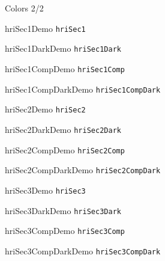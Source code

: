 \documentclass[compress]{beamer}
\begin{document}
\begin{frame}{Colors 2/2}
\begin{multicols}{2}

\begin{beamercolorbox}[wd=\linewidth,ht=2ex,dp=0.7ex]{hriSec1Demo}
	\texttt{hriSec1}
\end{beamercolorbox}
\begin{beamercolorbox}[wd=\linewidth,ht=2ex,dp=0.7ex]{hriSec1DarkDemo}
	\texttt{hriSec1Dark}
\end{beamercolorbox}
\begin{beamercolorbox}[wd=\linewidth,ht=2ex,dp=0.7ex]{hriSec1CompDemo}
	\texttt{hriSec1Comp}
\end{beamercolorbox}
\begin{beamercolorbox}[wd=\linewidth,ht=2ex,dp=0.7ex]{hriSec1CompDarkDemo}
	\texttt{hriSec1CompDark}
\end{beamercolorbox}

\begin{beamercolorbox}[wd=\linewidth,ht=2ex,dp=0.7ex]{hriSec2Demo}
	\texttt{hriSec2}
\end{beamercolorbox}
\begin{beamercolorbox}[wd=\linewidth,ht=2ex,dp=0.7ex]{hriSec2DarkDemo}
	\texttt{hriSec2Dark}
\end{beamercolorbox}
\begin{beamercolorbox}[wd=\linewidth,ht=2ex,dp=0.7ex]{hriSec2CompDemo}
	\texttt{hriSec2Comp}
\end{beamercolorbox}
\begin{beamercolorbox}[wd=\linewidth,ht=2ex,dp=0.7ex]{hriSec2CompDarkDemo}
	\texttt{hriSec2CompDark}
\end{beamercolorbox}

\begin{beamercolorbox}[wd=\linewidth,ht=2ex,dp=0.7ex]{hriSec3Demo}
	\texttt{hriSec3}
\end{beamercolorbox}
\begin{beamercolorbox}[wd=\linewidth,ht=2ex,dp=0.7ex]{hriSec3DarkDemo}
	\texttt{hriSec3Dark}
\end{beamercolorbox}
\begin{beamercolorbox}[wd=\linewidth,ht=2ex,dp=0.7ex]{hriSec3CompDemo}
	\texttt{hriSec3Comp}
\end{beamercolorbox}
\begin{beamercolorbox}[wd=\linewidth,ht=2ex,dp=0.7ex]{hriSec3CompDarkDemo}
	\texttt{hriSec3CompDark}
\end{beamercolorbox}


\end{multicols}
\end{frame}
\end{document}
